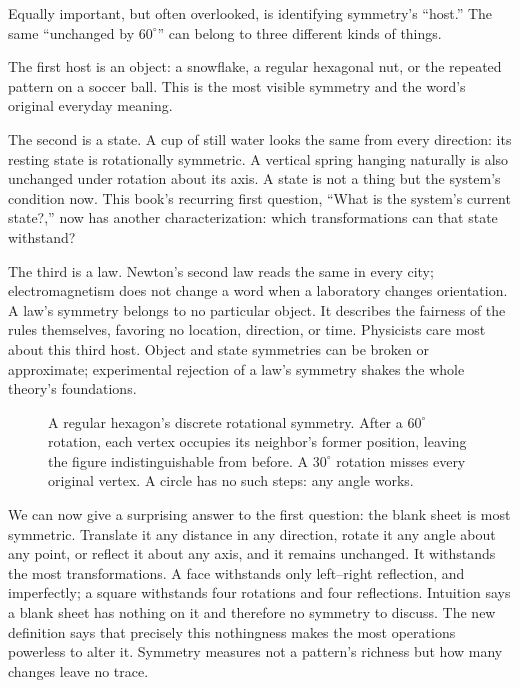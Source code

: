Equally important, but often overlooked, is identifying symmetry's ``host.'' The same ``unchanged by \(60^\circ\)'' can belong to three different kinds of things.

The first host is an object: a snowflake, a regular hexagonal nut, or the repeated pattern on a soccer ball. This is the most visible symmetry and the word's original everyday meaning.

The second is a state. A cup of still water looks the same from every direction: its resting state is rotationally symmetric. A vertical spring hanging naturally is also unchanged under rotation about its axis. A state is not a thing but the system's condition now. This book's recurring first question, ``What is the system's current state?,'' now has another characterization: which transformations can that state withstand?

The third is a law. Newton's second law reads the same in every city; electromagnetism does not change a word when a laboratory changes orientation. A law's symmetry belongs to no particular object. It describes the fairness of the rules themselves, favoring no location, direction, or time. Physicists care most about this third host. Object and state symmetries can be broken or approximate; experimental rejection of a law's symmetry shakes the whole theory's foundations.

\begin{figure}[htbp]
\centering
{}
\caption{A regular hexagon's discrete rotational symmetry. After a \(60^\circ\) rotation, each vertex occupies its neighbor's former position, leaving the figure indistinguishable from before. A \(30^\circ\) rotation misses every original vertex. A circle has no such steps: any angle works.}
\end{figure}

We can now give a surprising answer to the first question: the blank sheet is most symmetric. Translate it any distance in any direction, rotate it any angle about any point, or reflect it about any axis, and it remains unchanged. It withstands the most transformations. A face withstands only left--right reflection, and imperfectly; a square withstands four rotations and four reflections. Intuition says a blank sheet has nothing on it and therefore no symmetry to discuss. The new definition says that precisely this nothingness makes the most operations powerless to alter it. Symmetry measures not a pattern's richness but how many changes leave no trace.


